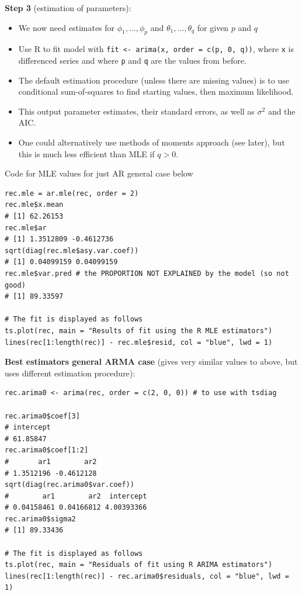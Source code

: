 \documentclass[11pt]{article}
\newcommand{\noi}{\noindent}
\begin{document}
\noi \textbf{Step 3} (estimation of parameters): \\
\begin{itemize}
    \item We now need estimates for $\phi_1,...,\phi_p$ and $\theta_1,...,\theta_q$ for given $p$ and $q$
    \item Use R to fit model with \texttt{fit <- arima(x, order = c(p, 0, q))}, where \texttt{x} is differenced series and where \texttt{p} and \texttt{q} are the values from before.
    \item The default estimation procedure (unless there are missing values) is to use conditional sum-of-squares to find starting values, then maximum likelihood.
    \item This output parameter estimates, their standard errors, as well as $\sigma^2$ and the AIC.
    \item One could alternatively use methods of moments approach (see later), but this is much less efficient than MLE if $q > 0$.
\end{itemize}
\noi Code for MLE values for just AR general case below
\begin{lstlisting}
rec.mle = ar.mle(rec, order = 2)
rec.mle$x.mean
# [1] 62.26153
rec.mle$ar
# [1] 1.3512809 -0.4612736
sqrt(diag(rec.mle$asy.var.coef))
# [1] 0.04099159 0.04099159
rec.mle$var.pred # the PROPORTION NOT EXPLAINED by the model (so not good)
# [1] 89.33597

# The fit is displayed as follows
ts.plot(rec, main = "Results of fit using the R MLE estimators")
lines(rec[1:length(rec)] - rec.mle$resid, col = "blue", lwd = 1)
\end{lstlisting}

\noi \textbf{Best estimators general ARMA case} (gives very similar values to above, but uses different estimation procedure): \\

\begin{lstlisting}
rec.arima0 <- arima(rec, order = c(2, 0, 0)) # to use with tsdiag

rec.arima0$coef[3]
# intercept 
# 61.85847
rec.arima0$coef[1:2]
#       ar1        ar2
# 1.3512196 -0.4612128
sqrt(diag(rec.arima0$var.coef))
#        ar1        ar2  intercept
# 0.04158461 0.04166812 4.00393366
rec.arima0$sigma2
# [1] 89.33436

# The fit is displayed as follows
ts.plot(rec, main = "Residuals of fit using R ARIMA estimators")
lines(rec[1:length(rec)] - rec.arima0$residuals, col = "blue", lwd = 1)
\end{lstlisting} \phantom{i}
\end{document}
